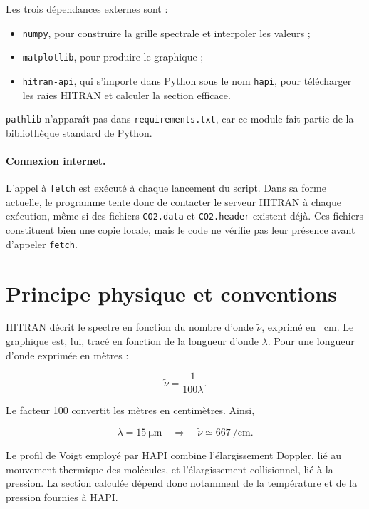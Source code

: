 \documentclass[11pt,a4paper]{article}
\newcommand{\code}[1]{\texttt{#1}}
\begin{document}
Les trois dépendances externes sont :

\begin{itemize}
  \item \code{numpy}, pour construire la grille spectrale et interpoler les
        valeurs ;
  \item \code{matplotlib}, pour produire le graphique ;
  \item \code{hitran-api}, qui s'importe dans Python sous le nom \code{hapi},
        pour télécharger les raies HITRAN et calculer la section efficace.
\end{itemize}

\code{pathlib} n'apparaît pas dans \code{requirements.txt}, car ce module fait
partie de la bibliothèque standard de Python.

\paragraph{Connexion internet.}
L'appel à \code{fetch} est exécuté à chaque lancement du script. Dans sa
forme actuelle, le programme tente donc de contacter le serveur HITRAN à
chaque exécution, même si des fichiers \code{CO2.data} et \code{CO2.header}
existent déjà. Ces fichiers constituent bien une copie locale, mais le code ne
vérifie pas leur présence avant d'appeler \code{fetch}.

\section{Principe physique et conventions}

HITRAN décrit le spectre en fonction du nombre d'onde
$\widetilde{\nu}$, exprimé en \si{\per\centi\metre}. Le graphique est, lui,
tracé en fonction de la longueur d'onde $\lambda$. Pour une longueur d'onde
exprimée en mètres :

\begin{equation}
  \widetilde{\nu}=\frac{1}{100\lambda}.
\end{equation}

Le facteur 100 convertit les mètres en centimètres. Ainsi,

\begin{equation}
  \lambda=\SI{15}{\micro\metre}
  \quad\Longrightarrow\quad
  \widetilde{\nu}\simeq\SI{667}{\per\centi\metre}.
\end{equation}

Le profil de Voigt employé par HAPI combine l'élargissement Doppler, lié au
mouvement thermique des molécules, et l'élargissement collisionnel, lié à la
pression. La section calculée dépend donc notamment de la température et de la
pression fournies à HAPI.
\end{document}
